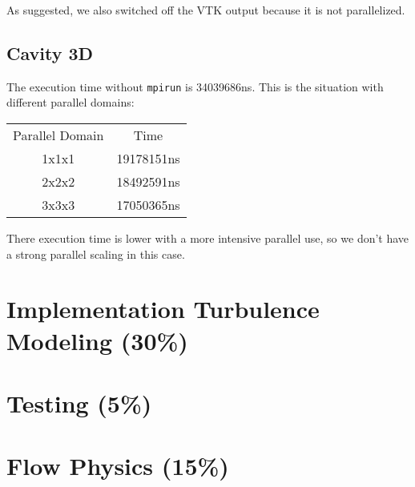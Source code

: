 \documentclass[
  english,        %
  font=palatino,     %
  onecolumn,      %
]{tumarticle}
\begin{document}
As suggested, we also switched off the VTK output because it is not parallelized.

\subsection{Cavity 3D}

The execution time without \texttt{mpirun} is 34039686ns. This is the situation with different parallel domains:

\begin{tabular}{c c}
  Parallel Domain & Time       \\
  1x1x1           & 19178151ns \\
  2x2x2           & 18492591ns \\
  3x3x3           & 17050365ns \\
\end{tabular}

There execution time is lower with a more intensive parallel use, so we don't have a strong parallel scaling in this case.
\section{Implementation Turbulence Modeling (30\%)}

\section{Testing (5\%)}

\section{Flow Physics (15\%)}
\end{document}

